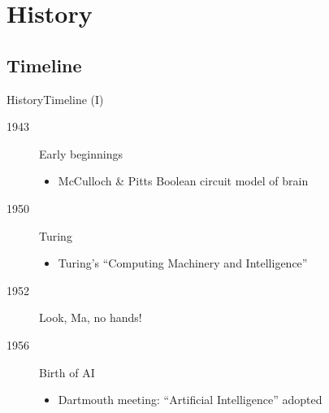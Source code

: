 \documentclass[10pt,compress]{beamer} %
\begin{document}


\section{History}
\subsection{Timeline}
\begin{frame}{History}{Timeline (I)}
	\begin{description}
	\item[1943] Early beginnings
		\begin{itemize}
		\item McCulloch \& Pitts Boolean circuit model of brain
		\end{itemize}
	\item[1950] Turing 
		\begin{itemize}
		\item Turing's ``Computing Machinery and Intelligence''
		\end{itemize}
	\item[1952] Look, Ma, no hands!
	\item[1956] Birth of AI
		\begin{itemize}
		\item Dartmouth meeting: ``Artificial Intelligence'' adopted
		\end{itemize}
	\end{description}
\end{frame}
\end{document}
